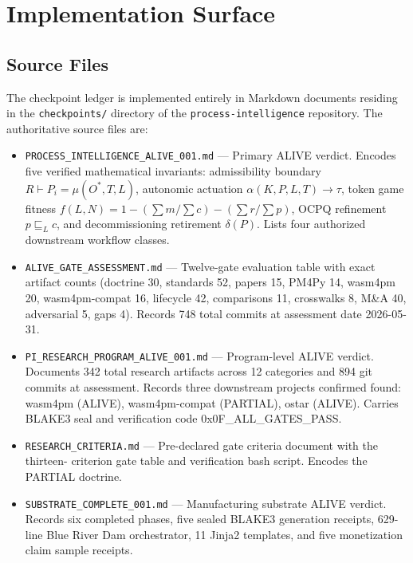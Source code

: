 \section{Implementation Surface}
\label{sec:checkpoints-implementation}

\subsection{Source Files}
\label{sec:checkpoints-implementation-source-files}

The checkpoint ledger is implemented entirely in Markdown documents residing in the
\texttt{checkpoints/} directory of the \texttt{process-intelligence} repository. The authoritative
source files are:

\begin{itemize}
  \item \texttt{PROCESS\_INTELLIGENCE\_ALIVE\_001.md} --- Primary ALIVE verdict. Encodes five
        verified mathematical invariants: admissibility boundary $R \vdash P_i = \mu(O^*, T, L)$,
        autonomic actuation $\alpha(K, P, L, T) \to \tau$, token game fitness
        $f(L, N) = 1 - (\sum m / \sum c) - (\sum r / \sum p)$, OCPQ refinement $p \sqsubseteq_L c$,
        and decommissioning retirement $\delta(P)$. Lists four authorized downstream workflow classes.

  \item \texttt{ALIVE\_GATE\_ASSESSMENT.md} --- Twelve-gate evaluation table with exact artifact
        counts (doctrine 30, standards 52, papers 15, PM4Py 14, wasm4pm 20, wasm4pm-compat 16,
        lifecycle 42, comparisons 11, crosswalks 8, M\&A 40, adversarial 5, gaps 4). Records
        748 total commits at assessment date 2026-05-31.

  \item \texttt{PI\_RESEARCH\_PROGRAM\_ALIVE\_001.md} --- Program-level ALIVE verdict. Documents
        342 total research artifacts across 12 categories and 894 git commits at assessment.
        Records three downstream projects confirmed found: wasm4pm (ALIVE), wasm4pm-compat
        (PARTIAL), ostar (ALIVE). Carries BLAKE3 seal and verification code 0x0F\_ALL\_GATES\_PASS.

  \item \texttt{RESEARCH\_CRITERIA.md} --- Pre-declared gate criteria document with the thirteen-
        criterion gate table and verification bash script. Encodes the PARTIAL doctrine.

  \item \texttt{SUBSTRATE\_COMPLETE\_001.md} --- Manufacturing substrate ALIVE verdict. Records six
        completed phases, five sealed BLAKE3 generation receipts, 629-line Blue River Dam orchestrator,
        11 Jinja2 templates, and five monetization claim sample receipts.


\end{itemize}
